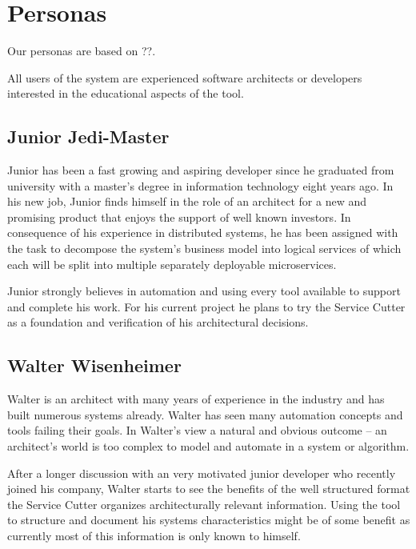 
\section{Personas}

Our personas are based on ??. %

All users of the system are experienced software architects or developers interested in the educational aspects of the tool.



\subsection{Junior Jedi-Master}

Junior has been a fast growing and aspiring developer since he graduated from university with a master's degree in information technology eight years ago. In his new job, Junior finds himself in the role of an architect for a new and promising product that enjoys the support of well known investors. In consequence of his experience in distributed systems, he has been assigned with the task to decompose the system's business model into logical services of which each will be split into multiple separately deployable microservices. 

Junior strongly believes in automation and using every tool available to support and complete his work. For his current project he plans to try the Service Cutter as a foundation and verification of his architectural decisions. 


\subsection{Walter Wisenheimer}

Walter is an architect with many years of experience in the industry and has built numerous systems already. Walter has seen many automation concepts and tools failing their goals. In Walter's view a natural and obvious outcome -- an architect's world is too complex to model and automate in a system or algorithm. 

After a longer discussion with an very motivated junior developer who recently joined his company, Walter starts to see the benefits of the well structured format the Service Cutter organizes architecturally relevant information. Using the tool to structure and document his systems characteristics might be of some benefit as currently most of this information is only known to himself. 

